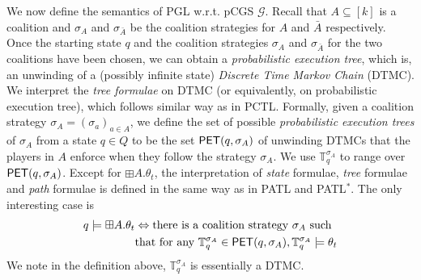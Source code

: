 \documentclass[times, 10 pt,twocolumn]{article}
\newcommand{\mb}[1]{\mathbb{#1}}
\newcommand{\mc}[1]{\mathcal{#1}}
\begin{document}
We now define the semantics of PGL w.r.t. pCGS $\mc{G}$. Recall
that $A\subseteq [k]$ is a coalition and $\sigma_A$ and
$\sigma_{\bar{A}}$ be the coalition strategies for $A$ and
$\bar{A}$ respectively. Once the starting state $q$ and the
coalition strategies $\sigma_A$ and $\sigma_{\bar{A}}$ for the two
coalitions have been chosen, we can obtain a \emph{probabilistic
execution tree}, which is, an unwinding of a (possibly infinite
state) \emph{Discrete Time Markov Chain} (DTMC). We interpret the
\emph{tree formulae} on DTMC (or equivalently, on probabilistic
execution tree), which follows similar way as in PCTL. Formally,
given a coalition strategy $\sigma_{A}=(\sigma_a)_{a\in A}$, we
define the set of possible \emph{probabilistic execution trees} of
$\sigma_{A}$ from a state $q\in Q$ to be the set ${\rm \sf PET}(q,
\sigma_A)$ of unwinding DTMCs that the players in $A$ enforce when
they follow the strategy $\sigma_{A}$. We use
$\mb{T}_q^{\sigma_A}$ to range  over ${\rm \sf PET}(q, \sigma_A)$.
%
%
%
%
Except for $\boxplus A. \theta_t$, the interpretation of
\emph{state} formulae, \emph{tree} formulae and \emph{path}
formulae is defined in the same way as in PATL and PATL$^*$. The
only interesting case is
\begin{eqnarray*}
q \models \boxplus A. \theta_t & \Leftrightarrow \mbox{there is a
coalition strategy }\sigma_A\mbox{ such} \\
& \mbox{that for any } \mathbb{T}_q^{\sigma_A}\in {\rm\sf PET}(q,
\sigma_A), \mathbb{T}_q^{\sigma_A} \models \theta_t
\end{eqnarray*}
We note in the definition above, $\mathbb{T}_q^{\sigma_A}$ is
essentially a DTMC.
\end{document}
